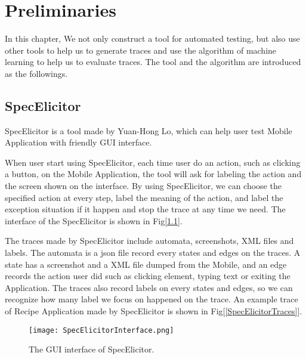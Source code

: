 \chapter{Preliminaries}\label{ch:preliminaries}

In this chapter, We not only construct a tool for automated testing,
but also use other tools to help us to generate traces 
and use the algorithm of machine learning to help us to evaluate traces.
The tool and the algorithm are introduced as the followings.

\section{SpecElicitor}

SpecElicitor is a tool made by Yuan-Hong Lo, 
which can help user test Mobile Application with friendly GUI interface.

When user start using SpecElicitor,
each time user do an action, such as clicking a button, on the Mobile Application, 
the tool will ask for labeling the action and the screen shown on the interface.
By using SpecElicitor, we can choose the specified action at every step, label the meaning of the action,
and label the exception situation if it happen and stop the trace at any time we need.
The interface of the SpecElicitor is shown in Fig[\ref{SpecElicitorInterface}].

The traces made by SpecElicitor include automata, screenshots, XML files and labels.
The automata is a json file record every states and edges on the traces.
A state has a screenshot and a XML file dumped from the Mobile,
and an edge records the action user did such as clicking element, typing text or exiting the Application.
The traces also record labels on every states and edges,
so we can recognize how many label we focus on happened on the trace.
An example trace of Recipe Application made by SpecElicitor is shown in Fig[\ref{SpecElicitorTraces}].


\begin{figure}[ht]
	\graphicspath{{pic/}}
	\begin{center}
		\texttt{[image: SpecElicitorInterface.png]}
		\caption{ The GUI interface of SpecElicitor.  }
		\label{SpecElicitorInterface}
	\end{center}
\end{figure}

